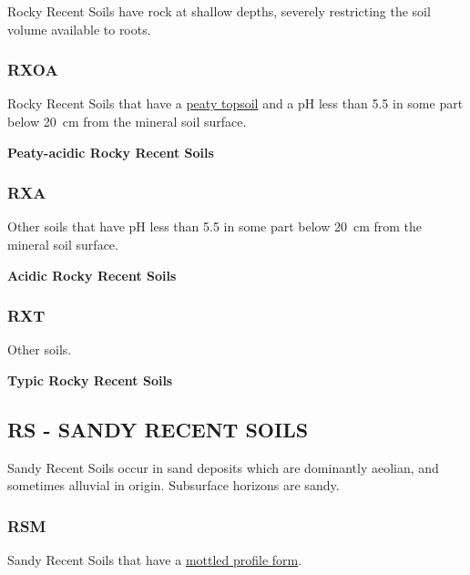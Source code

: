 \documentclass[
  letterpaper,
  DIV=11,
  numbers=noendperiod]{scrreprt}
\begin{document}
Rocky Recent Soils have rock at shallow depths, severely restricting the
soil volume available to roots.

\hypertarget{sec-key-RXOA}{%
\subsubsection{\texorpdfstring{\textbf{RXOA}}{RXOA}}\label{sec-key-RXOA}}

Rocky Recent Soils that have a \protect\hyperlink{sec-diag-pts}{peaty
topsoil} and a pH less than 5.5 in some part below 20~cm from the
mineral soil surface.

\textbf{Peaty-acidic Rocky Recent Soils}

\hypertarget{sec-key-RXA}{%
\subsubsection{\texorpdfstring{\textbf{RXA}}{RXA}}\label{sec-key-RXA}}

Other soils that have pH less than 5.5 in some part below 20~cm from the
mineral soil surface.

\textbf{Acidic Rocky Recent Soils}

\hypertarget{sec-key-RXT}{%
\subsubsection{\texorpdfstring{\textbf{RXT}}{RXT}}\label{sec-key-RXT}}

Other soils.

\textbf{Typic Rocky Recent Soils}

\hypertarget{sec-RS}{%
\subsection{\texorpdfstring{\textbf{RS} - SANDY RECENT
SOILS}{RS - SANDY RECENT SOILS}}\label{sec-RS}}

Sandy Recent Soils occur in sand deposits which are dominantly aeolian,
and sometimes alluvial in origin. Subsurface horizons are sandy.

\hypertarget{sec-key-RSM}{%
\subsubsection{\texorpdfstring{\textbf{RSM}}{RSM}}\label{sec-key-RSM}}

Sandy Recent Soils that have a
\protect\hyperlink{sec-diag-mottpf}{mottled profile form}.
\end{document}
